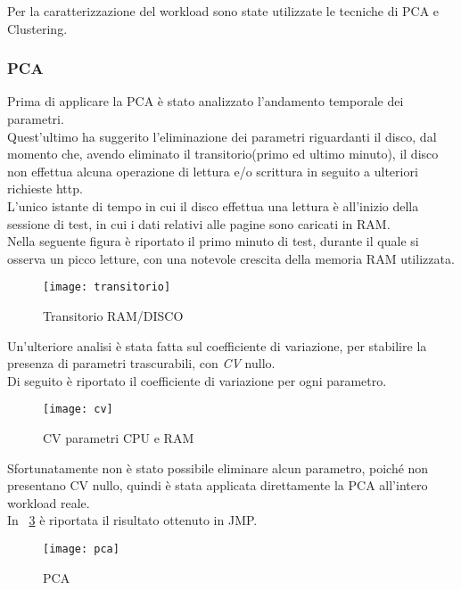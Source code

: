 Per la caratterizzazione del workload sono state utilizzate le tecniche di PCA e
Clustering.\\
\clearpage
\subsubsection{PCA}
Prima di applicare la PCA è stato analizzato l'andamento temporale dei parametri.\\
Quest'ultimo ha suggerito l'eliminazione dei parametri riguardanti il disco, dal
momento che, avendo eliminato il transitorio(primo ed ultimo minuto), il disco
non effettua alcuna operazione di lettura e/o scrittura in seguito a ulteriori
richieste http.\\
L'unico istante di tempo in cui il disco effettua una lettura è all'inizio
della sessione di test, in cui i dati relativi alle pagine sono caricati in RAM.\\
Nella seguente figura è riportato il primo minuto di test,
durante il quale si osserva un picco letture, con una notevole crescita della
memoria RAM utilizzata.\\

\begin{figure}[!htbp]
  \centering
  \texttt{[image: transitorio]}
  \caption{Transitorio RAM/DISCO}
  \label{transitorio}
\end{figure}

\clearpage

Un'ulteriore analisi è stata fatta sul coefficiente di variazione,
per stabilire la presenza di parametri trascurabili, con \textit{CV} nullo.\\
Di seguito è riportato il coefficiente di variazione per ogni parametro.\\

\begin{figure}[!htbp]
  \centering
  \texttt{[image: cv]}
  \caption{CV parametri CPU e RAM}
  \label{cv1}
\end{figure}
\clearpage
Sfortunatamente non è stato possibile eliminare alcun parametro, poiché non
presentano CV nullo, quindi è stata applicata direttamente la PCA all'intero
workload reale.\\
In \figurename~\ref{pca} è riportata il risultato ottenuto in JMP.\\

\begin{figure}[!htbp]
  \centering
  \texttt{[image: pca]}
  \caption{PCA}
  \label{pca}
\end{figure}


